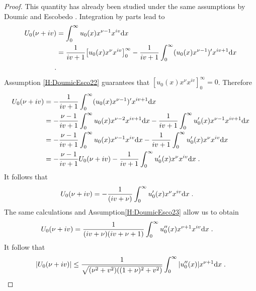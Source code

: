 \documentclass[11pt]{amsart}
\begin{document}
\begin{proof}
    This quantity has already been studied under the same assumptions by Doumic and Escobedo \cite{doumic2016time}. Integration by parts lead to 
        \begin{align*}
            U_0(\nu + i v) 
            &= \int_0^\infty u_0(x) x^{\nu-1}x^{i v}\mathrm dx \\
            &= \frac{1}{iv + 1} \big[ u_0(x) x^{\nu} x^{i v} \big]_0^\infty - \frac{1}{iv + 1} \int_0^\infty (u_0(x) x^{\nu-1})' x^{i v+1}\mathrm dx \\
            \; .
        \end{align*}
    Assumption \eqref{H:DoumicEsco22} guarantees that $[ u_0(x) x^{\nu} x^{i v} ]_0^\infty = 0$. Therefore
        \begin{align*}
            U_0(\nu + i v) 
            &= - \frac{1}{iv + 1} \int_0^\infty (u_0(x) x^{\nu-1})' x^{i v+1}\mathrm dx \\
            &= - \frac{\nu - 1}{iv + 1} \int_0^\infty u_0(x) x^{\nu-2} x^{i v + 1}\mathrm dx  - \frac{1}{iv + 1} \int_0^\infty u_0'(x) x^{\nu-1} x^{i v + 1}\mathrm dx \\
            &= - \frac{\nu - 1}{iv + 1} \int_0^\infty u_0(x) x^{\nu-1} x^{i v}\mathrm dx  - \frac{1}{iv + 1} \int_0^\infty u_0'(x) x^{\nu} x^{i v}\mathrm dx \\
            &= - \frac{\nu - 1}{iv + 1} U_0(\nu + i v)   - \frac{1}{iv + 1} \int_0^\infty u_0'(x) x^{\nu} x^{i v}\mathrm dx
            \; .
        \end{align*}
    It follows that 
        \begin{align*}
            U_0(\nu + i v)
            &= - \frac{1}{(iv + \nu)}\int_0^\infty u_0'(x) x^{\nu} x^{i v}\mathrm dx
            \; .
        \end{align*}
    The same calculations and Assumption\eqref{H:DoumicEsco23} allow us to obtain 
        \begin{align*}
            U_0(\nu + i v)
            &=  \frac{1}{(iv + \nu)(iv + \nu + 1)}\int_0^\infty u_0''(x) x^{\nu + 1} x^{i v}\mathrm dx
            \; .
        \end{align*}
    It follow that 
        \begin{equation*}
            |U_0(\nu + i v)| \leq \frac{1}{\sqrt{(\nu^2 + v^2)((1+\nu)^2 + v^2)}} \int_0^\infty |u_0''(x)| x^{\nu + 1} \mathrm dx
            \; .
        \end{equation*}
    

\end{proof}
\end{document}
